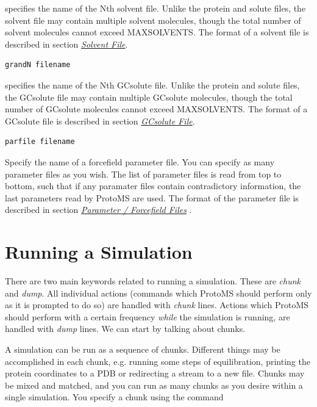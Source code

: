 \documentclass[letterpaper,10pt,english]{sphinxmanual}
\begin{document}
specifies the name of the Nth solvent file. Unlike the protein and solute files, the solvent file may contain multiple solvent molecules, though the total number of solvent molecules cannot exceed MAXSOLVENTS. The format of a solvent file is described in section {\hyperref[protoms:solventpdb]{\emph{Solvent File}}}.

\begin{Verbatim}[commandchars=\\\{\}]
grandN filename
\end{Verbatim}

specifies the name of the Nth GCsolute file. Unlike the protein and solute files, the GCsolute file may contain multiple GCsolute molecules, though the total number of GCsolute molecules cannot exceed MAXSOLVENTS. The format of a GCsolute file is described in section {\hyperref[protoms:gcpdb]{\emph{GCsolute File}}}.

\begin{Verbatim}[commandchars=\\\{\}]
parfile filename
\end{Verbatim}

Specify the name of a forcefield parameter file. You can specify as many parameter files as you wish. The list of parameter files is read from top to bottom, such that if any paramater files contain contradictory information, the last parameters read by ProtoMS are used. The format of the parameter file is described in section {\hyperref[protoms:parfil]{\emph{Parameter / Forcefield Files}}} .


\section{Running a Simulation}
\label{protoms:running-a-simulation}\label{protoms:runcmd}
There are two main keywords related to running a simulation. These are \emph{chunk} and \emph{dump}. All individual actions (commands which ProtoMS should perform only as it is prompted to do so) are handled with \emph{chunk} lines. Actions which ProtoMS should perform with a certain frequency \emph{while} the simulation is running, are handled with \emph{dump} lines. We can start by talking about chunks.

A simulation can be run as a sequence of chunks. Different things may be accomplished in each chunk, e.g. running some steps of equilibration, printing the protein coordinates to a PDB or redirecting a stream to a new file. Chunks may be mixed and matched, and you can run as many chunks as you desire within a single simulation. You specify a chunk using the command
\end{document}
